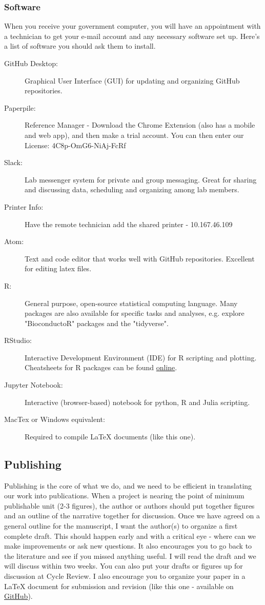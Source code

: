 \documentclass[10pt, letterpaper, twocolumn]{article} %
\begin{document}
\subsubsection{Software}
When you receive your government computer, you will have an appointment with a technician to get your e-mail account and any necessary software set up. Here's a list of software you should ask them to install.
\begin{description}
\item [GitHub Desktop:] Graphical User Interface (GUI) for updating and organizing GitHub repositories.
\item [Paperpile:] Reference Manager - Download the Chrome Extension (also has a mobile and web app), and then make a trial account. You can then enter our License: 4C8p-OmG6-NiAj-FcRf
\item [Slack:] Lab messenger system for private and group messaging. Great for sharing and discussing data, scheduling and organizing among lab members.
\item [Printer Info:] Have the remote technician add the shared printer - 10.167.46.109
\item [Atom:] Text and code editor that works well with GitHub repositories. Excellent for editing latex files.
\item [R:] General purpose, open-source statistical computing language. Many packages are also available for specific tasks and analyses, e.g. explore "BioconductoR" packages and the "tidyverse".
\item [RStudio:] Interactive Development Environment (IDE) for R scripting and plotting. Cheatsheets for R packages can be found \href{https://www.rstudio.com/resources/cheatsheets/}{online}.
\item [Jupyter Notebook:] Interactive (browser-based) notebook for python, R and Julia scripting.
\item [MacTex or Windows equivalent:] Required to compile LaTeX documents (like this one).
\end{description}

\subsection{Publishing}
Publishing is the core of what we do, and we need to be efficient in translating our work into publications. When a project is nearing the point of minimum publishable unit (2-3 figures), the author or authors should put together figures and an outline of the narrative together for discussion. Once we have agreed on a general outline for the manuscript, I want the author(s) to organize a first complete draft. This should happen early and with a critical eye - where can we make improvements or ask new questions. It also encourages you to go back to the literature and see if you missed anything useful. I will read the draft and we will discuss within two weeks. You can also put your drafts or figures up for discussion at Cycle Review. I also encourage you to organize your paper in a LaTeX document for submission and revision (like this one - available on \href{https://github.com/QVEU/QVEU/blob/main/ExpectationsDocument/main.tex}{GitHub}).
\end{document}
